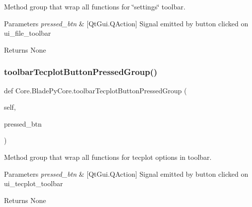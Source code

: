 Method group that wrap all functions for \char`\"{}settings\char`\"{} toolbar. 


\begin{DoxyParams}{Parameters}
{\em pressed\+\_\+btn} & \mbox{[}Qt\+Gui.\+Q\+Action\mbox{]} Signal emitted by button clicked on ui\+\_\+file\+\_\+toolbar \\
\hline
\end{DoxyParams}
\begin{DoxyReturn}{Returns}
None 
\end{DoxyReturn}
\hypertarget{class_core_1_1_blade_py_core_aabfc46144de45158b8d9c8952cfa1a7d}{}\label{class_core_1_1_blade_py_core_aabfc46144de45158b8d9c8952cfa1a7d} 
\subsubsection{\texorpdfstring{toolbar\+Tecplot\+Button\+Pressed\+Group()}{toolbarTecplotButtonPressedGroup()}}
{\footnotesize\ttfamily def Core.\+Blade\+Py\+Core.\+toolbar\+Tecplot\+Button\+Pressed\+Group (\begin{DoxyParamCaption}\item[{}]{self,  }\item[{}]{pressed\+\_\+btn }\end{DoxyParamCaption})}



Method group that wrap all functions for tecplot options in toolbar. 


\begin{DoxyParams}{Parameters}
{\em pressed\+\_\+btn} & \mbox{[}Qt\+Gui.\+Q\+Action\mbox{]} Signal emitted by button clicked on ui\+\_\+tecplot\+\_\+toolbar \\
\hline
\end{DoxyParams}
\begin{DoxyReturn}{Returns}
None 
\end{DoxyReturn}
\hypertarget{class_core_1_1_blade_py_core_ade955a1fc8334b12726d9f462ed25c62}{}\label{class_core_1_1_blade_py_core_ade955a1fc8334b12726d9f462ed25c62} 
